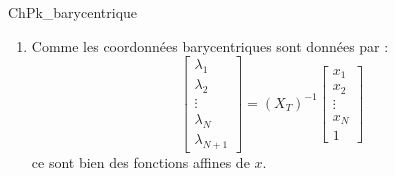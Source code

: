 \begin{corrige}{ChPk_barycentrique}
\begin{enumerate}
\medskip

En fait, pour tout point $x$ de $T$, on peut même définir toute coordonnée barycentrique $\lambda_i(x)$ avec la relation :
\[
\lambda_i (x) = \frac{ ( x - b_i ) \cdot (a_i - b_i ) 
}{ \| a_i - b_i \|^2 }
\]
où $b_i$ est le projeté orthogonal de $a_i$ sur $F_i$.

\item Comme les coordonnées barycentriques sont données par :
\[
\left [
\begin{array}{c}
\lambda_1 \\
\lambda_2 \\
\vdots  \\
\lambda_N \\
\lambda_{N+1}
\end{array}
\right ]
=
\left ( X_T \right )^{-1}
\left [
\begin{array}{c}
x_1 \\
x_2 \\
\vdots  \\
x_N \\
1
\end{array}
\right ]
\]
ce sont bien des fonctions affines de $x$.

\end{enumerate}

\end{corrige}

\medskip

